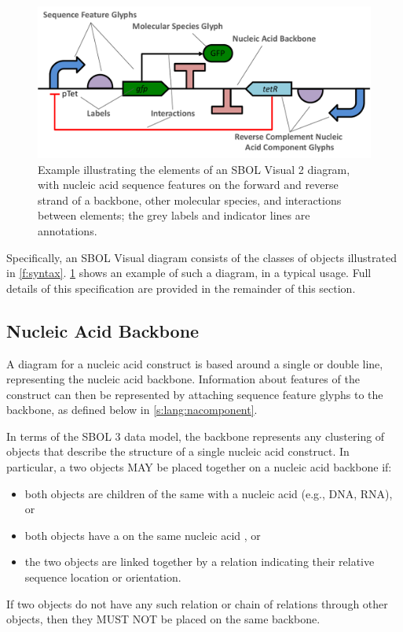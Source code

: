 \begin{figure}[h!]
\centering
\includegraphics[width=6in]{figures/SBOLgeneral.pdf}
\caption{Example illustrating the elements of an SBOL Visual 2 diagram, with nucleic acid sequence features on the forward and reverse strand of a backbone, other molecular species, and interactions between elements; the grey labels and indicator lines are annotations.}
\label{f:example}
\end{figure}

Specifically, an SBOL Visual diagram consists of the classes of objects illustrated in \ref{f:syntax}.
\ref{f:example} shows an example of such a diagram, in a typical usage.
Full details of this specification are provided in the remainder of this section.


\subsection{Nucleic Acid Backbone}
\label{s:lang:backbone}

A diagram for a nucleic acid construct is based around a single or double line, representing the nucleic acid backbone. 
Information about features of the construct can then be represented by attaching sequence feature glyphs to the backbone, as defined below in \ref{s:lang:nacomponent}.

In terms of the SBOL 3 data model, the backbone represents any clustering of  objects that describe the structure of a single nucleic acid construct. 
In particular, a two  objects MAY be placed together on a nucleic acid backbone if:
\begin{itemize}
\item both  objects are children of the same  with a nucleic acid  (e.g., DNA, RNA), or
\item both  objects have a  on the same nucleic acid , or
\item the two  objects are linked together by a  relation indicating their relative sequence location or orientation.
\end{itemize}
If two  objects do not have any such relation or chain of relations through other  objects, then they MUST NOT be placed on the same backbone.

